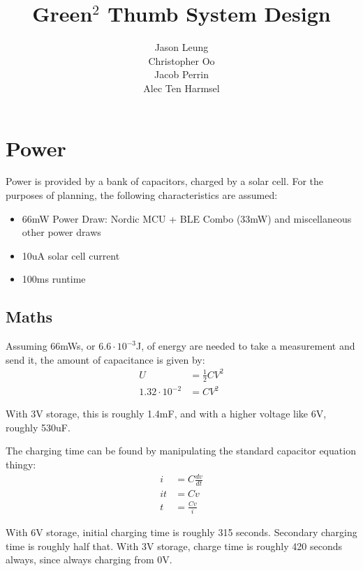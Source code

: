 \documentclass{article}
\begin{document}
\title{Green$^2$ Thumb System Design}
\author{
    Jason Leung\\
    Christopher Oo\\
    Jacob Perrin\\
    Alec Ten Harmsel
}
\date{}
\maketitle

\section{Power}
Power is provided by a bank of capacitors, charged by a solar cell. For the
purposes of planning, the following characteristics are assumed:

\begin{itemize}
    \item 66mW Power Draw: Nordic MCU + BLE Combo (33mW) and miscellaneous
        other power draws
    \item 10uA solar cell current
    \item 100ms runtime
\end{itemize}

\subsection{Maths}
Assuming 66mWs, or $6.6\cdot10^{-3}$J, of energy are needed to take a
measurement and send it, the amount of capacitance is given by: \begin{align*}
    U & = \frac{1}{2}CV^2\\
    1.32 \cdot 10^{-2} & = CV^2
\end{align*}

With 3V storage, this is roughly 1.4mF, and with a higher voltage like 6V,
roughly 530uF.

The charging time can be found by manipulating the standard capacitor equation
thingy: \begin{align*}
    i & = C\frac{dv}{dt}\\
    it & = Cv\\
    t & = \frac{Cv}{i}
\end{align*}

With 6V storage, initial charging time is roughly 315 seconds. Secondary
charging time is roughly half that. With 3V storage, charge time is roughly 420
seconds always, since always charging from 0V.
\end{document}
